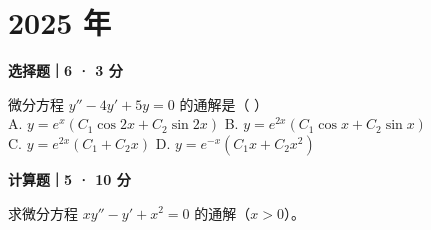 

\section*{2025 年}


\textbf{选择题｜6 · 3 分}

微分方程 $y'' - 4y' + 5y = 0$ 的通解是（ \quad ）\\
A. $y = e^x(C_1\cos 2x + C_2\sin 2x)$ \quad B. $y = e^{2x}(C_1\cos x + C_2\sin x)$\\
C. $y = e^{2x}(C_1 + C_2x)$ \quad D. $y = e^{-x}(C_1x + C_2x^2)$


\textbf{计算题｜5 · 10 分}

求微分方程 $xy'' - y' + x^2 = 0$ 的通解（$x > 0$）。
